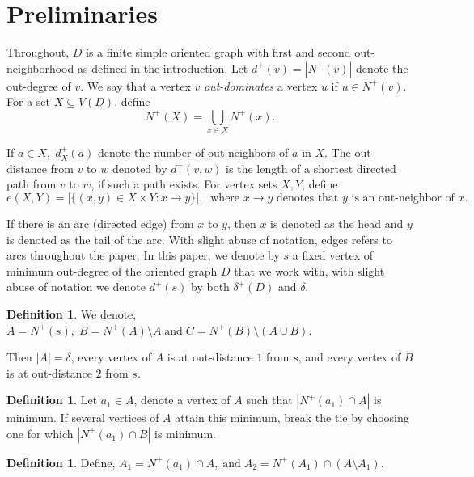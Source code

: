 \documentclass[a4paper,fleqn]{cas-sc}
\theoremstyle{definition}
\newtheorem{definition}[theorem]{Definition}
\begin{document}
\section{Preliminaries}
Throughout, \(D\) is a finite simple oriented graph with first and second out-neighborhood as defined in the introduction. Let $d^+(v)=|N^{+}(v)|$ denote the out-degree of $v$. We say that a vertex $v$ \emph{out-dominates} a vertex $u$ if $u\in N^+(v)$.
For a set \(X\subseteq V(D)\), define
\[
N^{+}(X)=\bigcup_{x\in X}N^{+}(x).
\]

If $a\in X, \; d_X^+(a)$ denote the number of out-neighbors of $a$ in $X$. The out-distance from \(v\) to \(w\) denoted by $d^+(v,w)$ is the length of a shortest directed path from \(v\) to \(w\), if such a path exists. For vertex sets $X,Y$, define
\[
e(X,Y)=|\{(x,y)\in X\times Y:x\to y\}|, \; \; \text{where $x\to y$ denotes that $y$ is an out-neighbor of $x$}.
\]




If there is an arc (directed edge) from $x$ to $y$, then $x$ is denoted as the head and $y$ is denoted as the tail of the arc. With slight abuse of notation, edges refers to arcs throughout the paper. In this paper, we denote by \(s\) a fixed vertex of minimum out-degree of the oriented graph $D$ that we work with, with slight abuse of notation we denote $d^+(s)$ by both $\delta^+(D)$ and $\delta$.


\begin{definition}
   We denote, \(A=N^{+}(s),\;
B=N^{+}(A)\setminus A \; \text{and} \;
C=N^{+}(B)\setminus(A\cup B).
\) 
\end{definition}
Then $|A|=\delta$, every vertex of \(A\) is at out-distance \(1\) from \(s\), and every vertex of \(B\) is at out-distance \(2\) from \(s\).

\begin{definition}
   Let \(a_{1}\in A\), denote a vertex of $A$ such that \(|N^{+}(a_{1})\cap A|\) is minimum. If several vertices of \(A\) attain this minimum, break the tie by choosing one for which \(|N^{+}(a_{1})\cap B|\) is minimum. 
\end{definition} 

\begin{definition}Define, \(
A_{1}=N^{+}(a_{1})\cap A, \; \text{and} \;
A_{2}=N^{+}(A_{1})\cap (A\setminus A_{1}).
\)
    
\end{definition}
\end{document}
